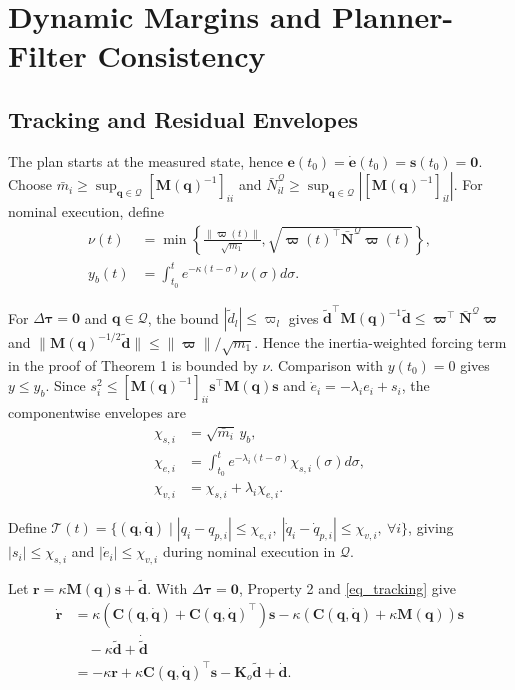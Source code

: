 \section{Dynamic Margins and Planner-Filter Consistency}
\subsection{Tracking and Residual Envelopes}

The plan starts at the measured state, hence $\bm e(t_0)=\dot{\bm e}(t_0)=\bm s(t_0)=\bm0$. Choose $\bar m_i\ge\sup_{\bm q\in\mathcal Q}[\bm M(\bm q)^{-1}]_{ii}$ and $\bar N^{\mathcal Q}_{il}\ge\sup_{\bm q\in\mathcal Q}|[\bm M(\bm q)^{-1}]_{il}|$. For nominal execution, define
\[
\begin{aligned}
\nu(t)&=\min\left\{\frac{\|\bm\varpi(t)\|}{\sqrt{m_1}},
\sqrt{\bm\varpi(t)^\top\bar{\bm N}^{\mathcal Q}\bm\varpi(t)}\right\},\\
y_b(t)&=\int_{t_0}^{t}e^{-\kappa(t-\sigma)}\nu(\sigma)d\sigma.
\end{aligned}
\]

For $\Delta\bm\tau=\bm0$ and $\bm q\in\mathcal Q$, the bound $|\tilde d_l|\le\varpi_l$ gives $\tilde{\bm d}^\top\bm M(\bm q)^{-1}\tilde{\bm d}\le\bm\varpi^\top\bar{\bm N}^{\mathcal Q}\bm\varpi$ and $\|\bm M(\bm q)^{-1/2}\tilde{\bm d}\|\le\|\bm\varpi\|/\sqrt{m_1}$. Hence the inertia-weighted forcing term in the proof of Theorem 1 is bounded by $\nu$. Comparison with $y(t_0)=0$ gives $y\le y_b$. Since $s_i^2\le[\bm M(\bm q)^{-1}]_{ii}\bm s^\top\bm M(\bm q)\bm s$ and $\dot e_i=-\lambda_ie_i+s_i$, the componentwise envelopes are
\begin{equation}
\begin{aligned}
\chi_{s,i}&=\sqrt{\bar m_i}\,y_b,\\
\chi_{e,i}&=\int_{t_0}^{t}e^{-\lambda_i(t-\sigma)}\chi_{s,i}(\sigma)d\sigma,\\
\chi_{v,i}&=\chi_{s,i}+\lambda_i\chi_{e,i}.
\end{aligned}
\label{eq_envelopes}
\end{equation}

Define $\mathcal T(t)=\{(\bm q,\dot{\bm q})\mid |q_i-q_{p,i}|\le\chi_{e,i},\ |\dot q_i-\dot q_{p,i}|\le\chi_{v,i},\ \forall i\}$, giving $|s_i|\le\chi_{s,i}$ and $|\dot e_i|\le\chi_{v,i}$ during nominal execution in $\mathcal Q$.

Let $\bm r=\kappa\bm M(\bm q)\bm s+\tilde{\bm d}$. With $\Delta\bm\tau=\bm0$, Property 2 and \eqref{eq_tracking} give
\[
\begin{aligned}
\dot{\bm r}&=\kappa(\bm C(\bm q,\dot{\bm q})+\bm C(\bm q,\dot{\bm q})^\top)\bm s
-\kappa(\bm C(\bm q,\dot{\bm q})+\kappa\bm M(\bm q))\bm s\\
&\quad-\kappa\tilde{\bm d}+\dot{\tilde{\bm d}}\\
&=-\kappa\bm r+\kappa\bm C(\bm q,\dot{\bm q})^\top\bm s
-\bm K_o\tilde{\bm d}+\dot{\bm d}.
\end{aligned}
\]

